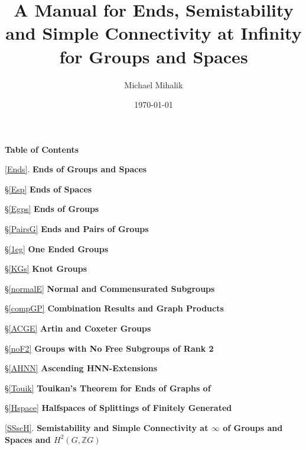 \documentclass[12pt]{article}
\title{A Manual for Ends, Semistability and Simple Connectivity at Infinity for Groups and Spaces}
\author{Michael Mihalik}
\date{\today}
\begin{document}
\maketitle
\newpage
\centerline{\bf Table of Contents}

\medskip

 \ref{Ends}. {\bf Ends of Groups and Spaces}

\noindent\hspace{.6in} \S \ref{Esp} {\bf Ends of Spaces}

\noindent\hspace{.6in} \S \ref{Egps} {\bf Ends of Groups}

\noindent\hspace{.6in} \S \ref{PairsG} {\bf Ends and Pairs of Groups}

\noindent\hspace{.6in} \S \ref{1eg} {\bf One Ended Groups}

\noindent\hspace{1.2in} \S \ref{KGs} {\bf Knot Groups}

\noindent\hspace{1.2in} \S \ref{normalE} {\bf Normal and Commensurated Subgroups} 

\noindent\hspace{1.2in} \S \ref{compGP}  {\bf Combination Results and Graph Products} 

\noindent\hspace{1.2in} \S \ref{ACGE} {\bf Artin and Coxeter Groups}

\noindent\hspace{1.2in} \S \ref{noF2} {\bf Groups with No Free Subgroups of Rank 2}

\noindent\hspace{1.2in} \S \ref{AHNN} {\bf Ascending HNN-Extensions} 

\noindent\hspace{1.2in} \S \ref{Touik} {\bf Touikan's Theorem for Ends of Graphs of} 

\noindent \hspace{1.7in}{\bf Groups}

\noindent\hspace{1.2in} \S \ref{Hspace} {\bf  Halfspaces of Splittings of Finitely Generated} 

\noindent \hspace{1.7in}{\bf Groups}

 \medskip
 
 \ref{SSscH}. {\bf Semistability and Simple Connectivity at $\infty$ of Groups and Spaces and $H^2(G,\mathbb ZG)$}
\end{document}
